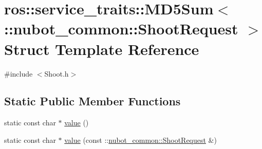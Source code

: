 \hypertarget{structros_1_1service__traits_1_1MD5Sum_3_01_1_1nubot__common_1_1ShootRequest_01_4}{\section{ros\-:\-:service\-\_\-traits\-:\-:M\-D5\-Sum$<$ \-:\-:nubot\-\_\-common\-:\-:Shoot\-Request $>$ Struct Template Reference}
\label{structros_1_1service__traits_1_1MD5Sum_3_01_1_1nubot__common_1_1ShootRequest_01_4}
}


{\ttfamily \#include $<$Shoot.\-h$>$}

\subsection*{Static Public Member Functions}
\begin{DoxyCompactItemize}
\item 
static const char $\ast$ \hyperlink{structros_1_1service__traits_1_1MD5Sum_3_01_1_1nubot__common_1_1ShootRequest_01_4_a06c6b5ff429e4791f4fbe12908a12e88}{value} ()
\item 
static const char $\ast$ \hyperlink{structros_1_1service__traits_1_1MD5Sum_3_01_1_1nubot__common_1_1ShootRequest_01_4_ab1a6399878f5101cfb0d8bf3cd716a8e}{value} (const \-::\hyperlink{namespacenubot__common_ab115c969a87ffc5940d2f26488a5baa3}{nubot\-\_\-common\-::\-Shoot\-Request} \&)
\end{DoxyCompactItemize}


